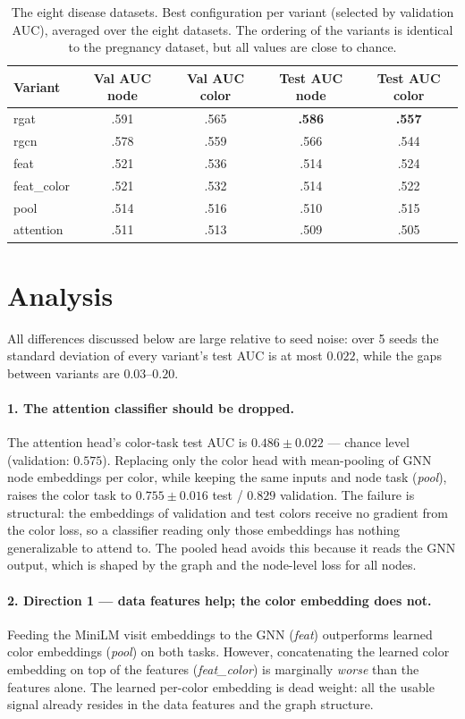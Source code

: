\documentclass[11pt]{article}
\begin{document}
\begin{table}[h!]
\centering
\small
\begin{tabular}{lcccc}
\toprule
Variant & Val AUC node & Val AUC color & Test AUC node & Test AUC color \\
\midrule
rgat       & .591 & .565 & \textbf{.586} & \textbf{.557} \\
rgcn       & .578 & .559 & .566 & .544 \\
feat       & .521 & .536 & .514 & .524 \\
feat\_color & .521 & .532 & .514 & .522 \\
pool       & .514 & .516 & .510 & .515 \\
attention  & .511 & .513 & .509 & .505 \\
\bottomrule
\end{tabular}
\caption{The eight disease datasets. Best configuration per variant (selected by validation AUC), averaged over the eight datasets. The ordering of the variants is identical to the pregnancy dataset, but all values are close to chance.}
\end{table}

\section*{Analysis}

All differences discussed below are large relative to seed noise: over 5 seeds the standard deviation of every variant's test AUC is at most $0.022$, while the gaps between variants are $0.03$--$0.20$.

\paragraph{1. The attention classifier should be dropped.}
The attention head's color-task test AUC is $0.486\pm0.022$ --- chance level (validation: $0.575$). Replacing only the color head with mean-pooling of GNN node embeddings per color, while keeping the same inputs and node task (\emph{pool}), raises the color task to $0.755\pm0.016$ test / $0.829$ validation. The failure is structural: the embeddings of validation and test colors receive no gradient from the color loss, so a classifier reading only those embeddings has nothing generalizable to attend to. The pooled head avoids this because it reads the GNN output, which is shaped by the graph and the node-level loss for all nodes.

\paragraph{2. Direction 1 --- data features help; the color embedding does not.}
Feeding the MiniLM visit embeddings to the GNN (\emph{feat}) outperforms learned color embeddings (\emph{pool}) on both tasks. However, concatenating the learned color embedding on top of the features (\emph{feat\_color}) is marginally \emph{worse} than the features alone. The learned per-color embedding is dead weight: all the usable signal already resides in the data features and the graph structure.
\end{document}
